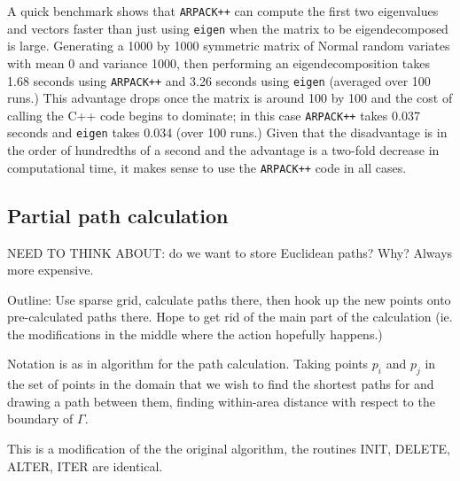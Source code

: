 \documentclass[a4paper,10pt]{article}
\begin{document}
A quick benchmark shows that \texttt{ARPACK++} can compute the first two eigenvalues and vectors faster than just using \texttt{eigen} when the matrix to be eigendecomposed is large. Generating a 1000 by 1000 symmetric matrix of Normal random variates with mean 0 and variance 1000, then performing an eigendecomposition takes 1.68 seconds using \texttt{ARPACK++} and 3.26 seconds using \texttt{eigen} (averaged over 100 runs.) This advantage drops once the matrix is around 100 by 100 and the cost of calling the C++ code begins to dominate; in this case \texttt{ARPACK++} takes 0.037 seconds and \texttt{eigen} takes 0.034 (over 100 runs.) Given that the disadvantage is in the order of hundredths of a second and the advantage is a two-fold decrease in computational time, it makes sense to use the \texttt{ARPACK++} code in all cases.


\subsection{Partial path calculation}

NEED TO THINK ABOUT: do we want to store Euclidean paths? Why? Always more expensive.

Outline: Use sparse grid, calculate paths there, then hook up the new points onto pre-calculated paths there. Hope to get rid of the main part of the calculation (ie. the modifications in the middle where the action hopefully happens.)

Notation is as in algorithm for the path calculation. Taking points $p_i$ and $p_j$ in the set of points in the domain that we wish to find the shortest paths for and drawing a path between them, finding within-area distance with respect to the boundary of $\Gamma$.

This is a modification of the the original algorithm, the routines INIT, DELETE, ALTER, ITER are identical.
\end{document}
